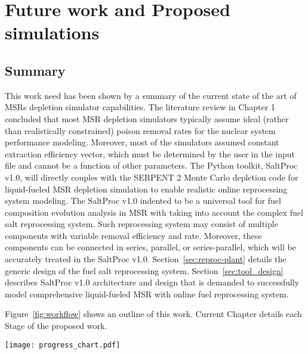 \chapter[Future work and Proposed simulations]{Future work and Proposed 
simulations}

\section{Summary}
This work need has been shown by a summary of the current state of the 
art of \glspl{MSR} depletion simulator capabilities. The literature review in 
Chapter 1 concluded that most \gls{MSR} depletion simulators typically assume 
ideal (rather than realistically constrained) poison removal rates for the 
nuclear system performance modeling. Moreover, most of the simulators assumed 
constant extraction efficiency vector, which must be determined by the user in 
the input file and cannot be a function of other parameters. The Python 
toolkit, SaltProc v1.0, will directly couples with the SERPENT 2 Monte Carlo 
depletion code for liquid-fueled \gls{MSR} depletion simulation to enable 
realistic online reprocessing system modeling. The SaltProc v1.0 indented to 
be a universal tool for fuel composition evolution analysis in \gls{MSR} with 
taking into account the complex fuel salt reprocessing system. Such 
reprocessing system may consist of multiple components with variable removal 
efficiency and rate. Moreover, these components can be connected in series, 
parallel, or series-parallel, which will be accurately treated in the SaltProc 
v1.0. Section~\ref{sec:reproc-plant} details the generic design of the fuel 
salt reprocessing system. Section~\ref{sec:tool_design} describes SaltProc 
v1.0 architecture and design that is demanded to successfully model 
comprehensive liquid-fueled \gls{MSR} with online fuel reprocessing system. 

Figure~\ref{fig:workflow} shows an outline of this work. Current  
Chapter details each Stage of the proposed work.
 \begin{sidewaysfigure}[ht!] %
 	\centering
 	\texttt{[image: progress\_chart.pdf]} 
 	\caption{Workflow for the simulations proposed in this work.}
 	\label{fig:workflow}
 \end{sidewaysfigure}
 \FloatBarrier
 
 
